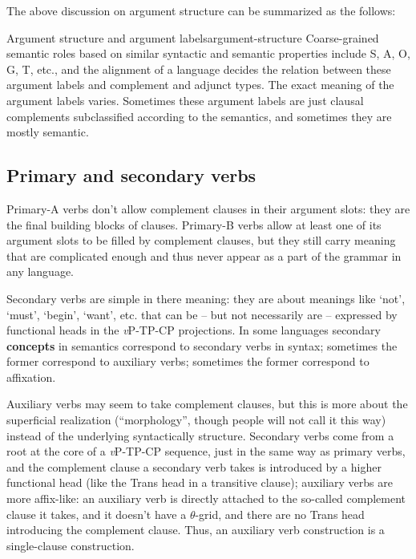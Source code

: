 \documentclass[UTF8, a4paper, oneside, scheme=plain]{ctexart}
\newcommand*{\concept}[1]{\textbf{#1}}
\newcommand*{\translate}[1]{`#1'}
\newcommand*{\vP}{\textit{v}P}
\begin{document}
The above discussion on argument structure can be summarized as the follows:
\begin{infobox}{Argument structure and argument labels}{argument-structure}
    Coarse-grained semantic roles based on similar syntactic and semantic properties 
    include S, A, O, G, T, etc.,
    and the alignment of a language decides 
    the relation between these argument labels
    and complement and adjunct types.
    The exact meaning of the argument labels varies.
    Sometimes these argument labels are just clausal complements subclassified 
    according to the semantics,
    and sometimes they are mostly semantic.
\end{infobox}

\subsection{Primary and secondary verbs}

Primary-A verbs don't allow complement clauses in their argument slots:
they are the final building blocks of clauses.
Primary-B verbs allow at least one of its argument slots to be filled by complement clauses,
but they still carry meaning that are complicated enough 
and thus never appear as a part of the grammar in any language.

Secondary verbs are simple in there meaning:
they are about meanings like \translate{not}, \translate{must}, \translate{begin}, \translate{want}, etc.
that can be -- but not necessarily are -- expressed by 
functional heads in the \vP{}-TP-CP projections.
In some languages secondary \concept{concepts} in semantics 
correspond to secondary verbs in syntax;
sometimes the former correspond to auxiliary verbs;
sometimes the former correspond to affixation.

Auxiliary verbs may seem to take complement clauses,
but this is more about the superficial realization 
(``morphology'', though people will not call it this way)
instead of the underlying syntactically structure.
Secondary verbs come from a root at the core of a \vP-TP-CP sequence, 
just in the same way as primary verbs,
and the complement clause a secondary verb takes 
is introduced by a higher functional head (like the Trans head in a transitive clause);
auxiliary verbs are more affix-like:
an auxiliary verb is directly attached to the so-called complement clause it takes,
and it doesn't have a $\theta$-grid,
and there are no Trans head introducing the complement clause.
Thus, an auxiliary verb construction is a single-clause construction.
\end{document}
